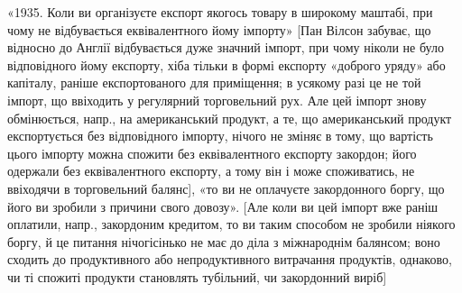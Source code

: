 «1935. Коли ви організуєте експорт якогось товару в широкому маштабі,
при чому не відбувається еквівалентного йому імпорту» [Пан Вілсон забуває,
що відносно до Англії відбувається дуже значний імпорт, при чому ніколи не
було відповідного йому експорту, хіба тільки в формі експорту «доброго уряду»
або капіталу, раніше експортованого для приміщення; в усякому разі це не той
імпорт, що ввіходить у регулярний торговельний рух. Але цей імпорт знову
обмінюється, напр., на американський продукт, а те, що американський
продукт експортується без відповідного імпорту, нічого не зміняє в тому, що
вартість цього імпорту можна спожити без еквівалентного експорту закордон;
його одержали без еквівалентного експорту, а тому він і може споживатись, не
ввіходячи в торговельний балянс], «то ви не оплачуєте закордонного боргу, що
його ви зробили з причини свого довозу». [Але коли ви цей імпорт вже
раніш оплатили, напр., закордоним кредитом, то ви таким способом не зробили
ніякого боргу, й це питання нічогісінько не має до діла з міжнароднім балянсом;
воно сходить до продуктивного або непродуктивного витрачання продуктів,
однаково, чи ті спожиті продукти становлять тубільний, чи закордонний виріб]
